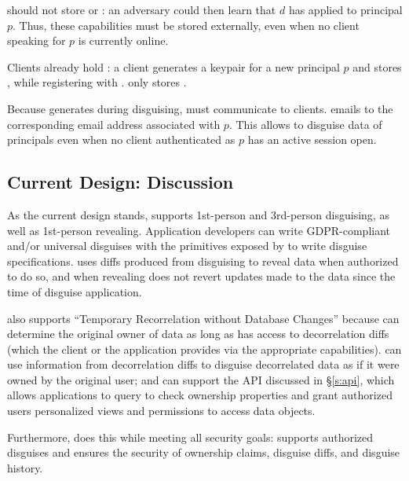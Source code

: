\sys should not store  or : an adversary could then learn that $d$ has applied to
principal $p$. Thus, these capabilities must be stored externally, even when no client speaking for
$p$ is currently online.
%
%

Clients already hold : a client generates a keypair for a new principal $p$ and stores
, while registering  with \sys. \sys only stores .

Because \sys generates  during disguising, \sys must communicate  to clients.
\sys emails  to the corresponding email address associated with $p$.  This allows \sys to
disguise data of principals even when no client authenticated as $p$ has an active session open.

\subsection{Current Design: Discussion}
As the current design stands, \sys supports 1st-person and 3rd-person disguising, as well as
1st-person revealing.
%
Application developers can write GDPR-compliant and/or universal disguises with the primitives
exposed by \sys to write disguise specifications.
%
\sys uses diffs produced from disguising to reveal data when authorized to do so, and when
revealing does not revert updates made to the data since the time of disguise application.

%
\sys also supports ``Temporary Recorrelation without Database Changes'' because \sys can determine
the original owner of data as long as \sys has access to decorrelation diffs (which the client or
the application provides via the appropriate capabilities).
%
\sys can use information from decorrelation diffs to disguise decorrelated data as if it were owned
by the original user; and 
%
\sys can support the API discussed in \S\ref{s:api}, which allows applications to query \sys to
check ownership properties and grant authorized users personalized views and permissions to access
data objects.

Furthermore, \sys does this while meeting all security goals: \sys supports authorized disguises and
ensures the security of ownership claims, disguise diffs, and disguise history.

